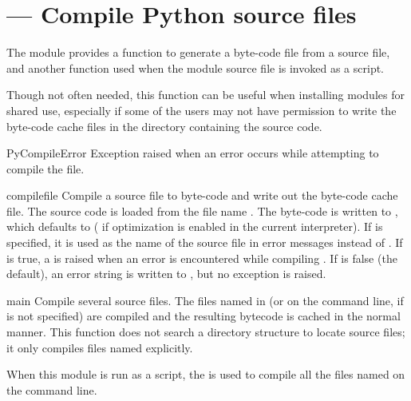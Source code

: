 \section{ ---
         Compile Python source files}





The  module provides a function to generate a
byte-code file from a source file, and another function used when the
module source file is invoked as a script.

Though not often needed, this function can be useful when installing
modules for shared use, especially if some of the users may not have
permission to write the byte-code cache files in the directory
containing the source code.

\begin{excdesc}{PyCompileError}
Exception raised when an error occurs while attempting to compile the file.
\end{excdesc}

\begin{funcdesc}{compile}{file}
  Compile a source file to byte-code and write out the byte-code cache 
  file.  The source code is loaded from the file name .  The 
  byte-code is written to , which defaults to 
  \code{+}  ( if optimization is enabled in the
  current interpreter).  If  is specified, it is used as
  the name of the source file in error messages instead of . 
  If  is true, a  is raised when
  an error is encountered while compiling . If 
  is false (the default), an error string is written to ,
  but no exception is raised.
\end{funcdesc}

\begin{funcdesc}{main}{}
  Compile several source files.  The files named in  (or on
  the command line, if  is not specified) are compiled and
  the resulting bytecode is cached in the normal manner.  This
  function does not search a directory structure to locate source
  files; it only compiles files named explicitly.
\end{funcdesc}

When this module is run as a script, the  is used to
compile all the files named on the command line.

\begin{seealso}
\end{seealso}
